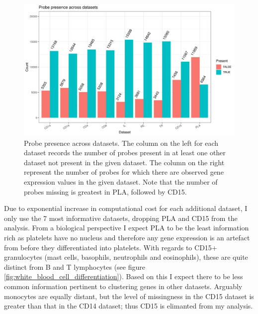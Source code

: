 \documentclass[12pt]{article} %
\begin{document}
	\begin{figure}
		\centering
		\includegraphics[scale=0.9 ]{Images/Data_inspection/probe_presence_across_datasets_no_all.png}
		\caption{Probe presence across datasets. The column on the left for each dataset records the number of probes present in at least one other dataset not present in the given dataset. The column on the right represent the number of probes for which there are observed gene expression values  in the given dataset. Note that the number of probes missing is greatest in PLA, followed by CD15.}
		\label{fig:probe_presence_across_datasets}
	\end{figure}
	
	
	Due to exponential increase in computational cost for each additional dataset, I only use the 7 most informative datasets, dropping PLA and CD15 from the analysis. From a biological perspective I expect PLA to be the least information rich as platelets have no nucleus \citep{Wrighthistogenesisbloodplatelets1910} and therefore any gene expression is an artefact from before they differentiated into platelets. With regards to CD15+ granulocytes (mast cells, basophils, neutrophils and eosinophils), these are quite distinct from B and T lymphocytes (see figure \ref{fig:white_blood_cell_differentiation}). Based on this I expect there to be less common information pertinent to clustering genes in other datasets. Arguably monocytes are equally distant, but the level of missingness in the CD15 dataset is greater than that in the CD14 dataset; thus CD15 is elimanted from my analysis.
\end{document}
